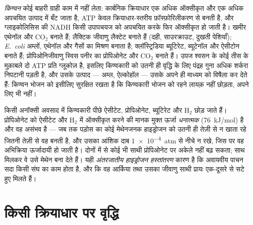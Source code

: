 \begin{definition}[किण्वन, फिर से]\label{def:b2:microbial-metabolism:fermentation}
\emph{किण्वन} कोई बाहरी ग्राही काम में नहीं लेता: कार्बनिक क्रियाधार
एक अधिक ऑक्सीकृत और एक अधिक अपचयित उत्पाद में बँट जाता है, ATP केवल
क्रियाधार-स्तरीय फ़ॉस्फ़ोरिलीकरण से बनती है, और ग्लाइकोलिसिस की NADH
किसी उपापचयज को अपचयित करके फिर ऑक्सीकृत हो जाती है। खमीर एथेनॉल और
$\mathrm{CO_2}$ बनाते हैं; लैक्टिक जीवाणु लैक्टेट बनाते हैं (दही,
साउरक्राउट, दुखती पेशियाँ); \emph{E.~coli} अम्लों, एथेनॉल और गैसों का
मिश्रण बनाता है; क्लॉस्ट्रिडिया ब्यूटिरेट, ब्यूटेनॉल और ऐसीटोन बनाते
हैं; प्रोपिओनिजीवाणु स्विस पनीर का प्रोपिओनेट और $\mathrm{CO_2}$ बनाते
हैं। उपज श्वसन के कोई तीस के मुक़ाबले दो ATP प्रति ग्लूकोज़ है, इसलिए
किण्वकारी को उतनी ही वृद्धि के लिए पंद्रह गुना अधिक शर्करा निपटानी पड़ती
है, और उसके उत्पाद --- अम्ल, ऐल्कोहॉल --- उसके अपने ही माध्यम को
विषैला कर देते हैं: किण्वन भोजन को इसीलिए सुरक्षित रखता है कि किण्वकारी
भोजन को रहने लायक़ नहीं छोड़ता, अपने लिए भी नहीं।
\end{definition}

\begin{example}[सहभोजिता: बचे-खुचे पर जीना]\label{ex:b2:microbial-metabolism:syntrophy}
किसी अनॉक्सी अवसाद में किण्वकारी पीछे ऐसीटेट, प्रोपिओनेट, ब्यूटिरेट और
$\mathrm{H_2}$ छोड़ जाते हैं। प्रोपिओनेट को ऐसीटेट और
$\mathrm{H_2}$ में ऑक्सीकृत करने की मानक मुक्त ऊर्जा \emph{धनात्मक}
(\qty{+76}{kJ/mol}) है और वह असंभव है --- जब तक पड़ोस का कोई मेथेनजनक
हाइड्रोजन को उतनी ही तेज़ी से न खाता रहे जितनी तेज़ी से वह बनती है, और
उसका आंशिक दाब \qty{1e-4}{atm} से नीचे न रखे, जिस पर वह अभिक्रिया
ऊर्जादायी हो जाती है। दोनों में से कोई भी साथी प्रोपिओनेट पर अकेले नहीं
बढ़ सकता; साथ मिलकर वे उसे मेथेन बना देते हैं। यही \emph{अंतरजातीय
हाइड्रोजन हस्तांतरण} कारण है कि अवायवीय पाचन सदा किसी संघ का काम होता
है, और कि वह आर्किया तथा उसका जीवाणु साथी प्रायः एक-दूसरे से सटे हुए
मिलते हैं।
\end{example}

\section{किसी क्रियाधार पर वृद्धि}

